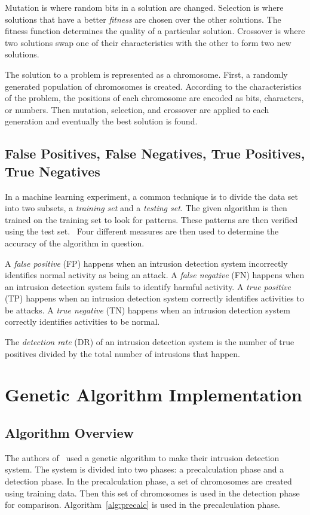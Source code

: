 \documentclass{sig-alternate}
\begin{document}
Mutation is where random bits in a solution are changed. Selection is where solutions that have a better \emph{fitness} are chosen over the other solutions. The fitness function determines the quality of a particular solution. Crossover is where two solutions swap one of their characteristics with the other to form two new solutions.

The solution to a problem is represented as a chromosome. First, a randomly generated population of chromosomes is created. According to the characteristics of the problem, the positions of each chromosome are encoded as bits, characters, or numbers. Then mutation, selection, and crossover are applied to each generation and eventually the best solution is found.~\cite{DBLP:journals/corr/abs-1204-6416}




\subsection{False Positives, False Negatives, True Positives, True Negatives}
\label{sec:PosNeg}
In a machine learning experiment, a common technique is to divide the data set into two subsets, a \emph{training set} and a \emph{testing set}. The given algorithm is then trained on the training set to look for patterns. These patterns are then verified using the test set.~\cite{bc1_ecindm} Four different measures are then used to determine the accuracy of the algorithm in question.

A \emph{false positive} (FP) happens when an intrusion detection system incorrectly identifies normal activity as being an attack. A \emph{false negative} (FN) happens when an intrusion detection system fails to identify harmful activity. A \emph{true positive} (TP) happens when an intrusion detection system correctly identifies activities to be attacks. A \emph{true negative} (TN) happens when an intrusion detection system correctly identifies activities to be normal.

The \emph{detection rate} (DR) of an intrusion detection system is the number of true positives divided by the total number of intrusions that happen.~\cite{ids}




\section{Genetic Algorithm Implementation}
\label{sec:genAlgImp}

\subsection{Algorithm Overview}
The authors of~\cite{DBLP:journals/corr/abs-1204-1336} used a genetic algorithm to make their intrusion detection system. The system is divided into two phases: a precalculation phase and a detection phase. In the precalculation phase, a set of chromosomes are created using training data. Then this set of chromosomes is used in the detection phase for comparison. Algorithm~\ref{alg:precalc} is used in the precalculation phase.
\end{document}
